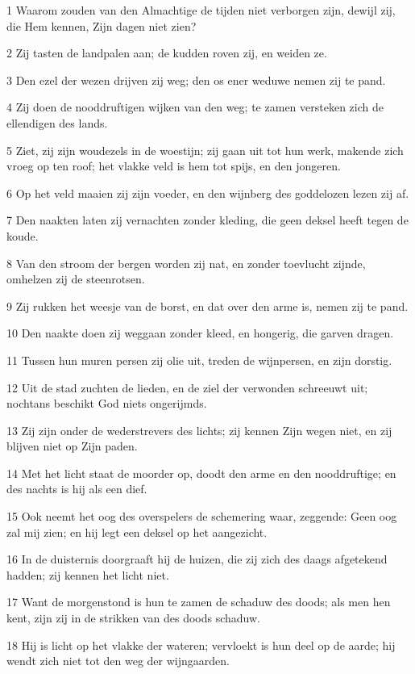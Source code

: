 \par 1 Waarom zouden van den Almachtige de tijden niet verborgen zijn, dewijl zij, die Hem kennen, Zijn dagen niet zien?
\par 2 Zij tasten de landpalen aan; de kudden roven zij, en weiden ze.
\par 3 Den ezel der wezen drijven zij weg; den os ener weduwe nemen zij te pand.
\par 4 Zij doen de nooddruftigen wijken van den weg; te zamen versteken zich de ellendigen des lands.
\par 5 Ziet, zij zijn woudezels in de woestijn; zij gaan uit tot hun werk, makende zich vroeg op ten roof; het vlakke veld is hem tot spijs, en den jongeren.
\par 6 Op het veld maaien zij zijn voeder, en den wijnberg des goddelozen lezen zij af.
\par 7 Den naakten laten zij vernachten zonder kleding, die geen deksel heeft tegen de koude.
\par 8 Van den stroom der bergen worden zij nat, en zonder toevlucht zijnde, omhelzen zij de steenrotsen.
\par 9 Zij rukken het weesje van de borst, en dat over den arme is, nemen zij te pand.
\par 10 Den naakte doen zij weggaan zonder kleed, en hongerig, die garven dragen.
\par 11 Tussen hun muren persen zij olie uit, treden de wijnpersen, en zijn dorstig.
\par 12 Uit de stad zuchten de lieden, en de ziel der verwonden schreeuwt uit; nochtans beschikt God niets ongerijmds.
\par 13 Zij zijn onder de wederstrevers des lichts; zij kennen Zijn wegen niet, en zij blijven niet op Zijn paden.
\par 14 Met het licht staat de moorder op, doodt den arme en den nooddruftige; en des nachts is hij als een dief.
\par 15 Ook neemt het oog des overspelers de schemering waar, zeggende: Geen oog zal mij zien; en hij legt een deksel op het aangezicht.
\par 16 In de duisternis doorgraaft hij de huizen, die zij zich des daags afgetekend hadden; zij kennen het licht niet.
\par 17 Want de morgenstond is hun te zamen de schaduw des doods; als men hen kent, zijn zij in de strikken van des doods schaduw.
\par 18 Hij is licht op het vlakke der wateren; vervloekt is hun deel op de aarde; hij wendt zich niet tot den weg der wijngaarden.
